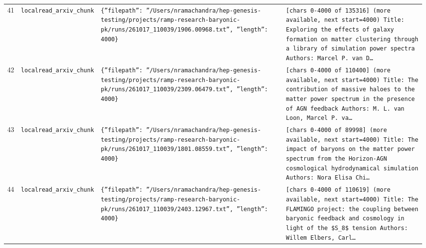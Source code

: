 \documentclass[11pt,a4paper]{article}
\begin{document}
\begin{longtable}{@{}p{}p{}p{}p{}@{}}
41 & \texttt{local}\newline\texttt{read\_\allowbreak{}arxiv\_\allowbreak{}chunk} & \texttt{\{''filepath'':\allowbreak{} ''/\allowbreak{}Users/\allowbreak{}nramachandra/\allowbreak{}hep-genesis-testing/\allowbreak{}projects/\allowbreak{}ramp-research-baryonic-pk/\allowbreak{}runs/\allowbreak{}261017\_\allowbreak{}110039/\allowbreak{}1906.00968.txt'',\allowbreak{} ''length'':\allowbreak{} 4000\}\allowbreak{}} & \texttt{[chars 0-4000 of 135316]\allowbreak{} (more available,\allowbreak{} next start=\allowbreak{}4000)\allowbreak{}  Title:\allowbreak{} Exploring the effects of galaxy formation on matter clustering through a library of simulation power spectra Authors:\allowbreak{} Marcel P. van D\ldots{}\allowbreak{}} \\
42 & \texttt{local}\newline\texttt{read\_\allowbreak{}arxiv\_\allowbreak{}chunk} & \texttt{\{''filepath'':\allowbreak{} ''/\allowbreak{}Users/\allowbreak{}nramachandra/\allowbreak{}hep-genesis-testing/\allowbreak{}projects/\allowbreak{}ramp-research-baryonic-pk/\allowbreak{}runs/\allowbreak{}261017\_\allowbreak{}110039/\allowbreak{}2309.06479.txt'',\allowbreak{} ''length'':\allowbreak{} 4000\}\allowbreak{}} & \texttt{[chars 0-4000 of 110400]\allowbreak{} (more available,\allowbreak{} next start=\allowbreak{}4000)\allowbreak{}  Title:\allowbreak{} The contribution of massive haloes to the matter power spectrum in the presence of AGN feedback Authors:\allowbreak{} M. L. van Loon,\allowbreak{} Marcel P. va\ldots{}\allowbreak{}} \\
43 & \texttt{local}\newline\texttt{read\_\allowbreak{}arxiv\_\allowbreak{}chunk} & \texttt{\{''filepath'':\allowbreak{} ''/\allowbreak{}Users/\allowbreak{}nramachandra/\allowbreak{}hep-genesis-testing/\allowbreak{}projects/\allowbreak{}ramp-research-baryonic-pk/\allowbreak{}runs/\allowbreak{}261017\_\allowbreak{}110039/\allowbreak{}1801.08559.txt'',\allowbreak{} ''length'':\allowbreak{} 4000\}\allowbreak{}} & \texttt{[chars 0-4000 of 89998]\allowbreak{} (more available,\allowbreak{} next start=\allowbreak{}4000)\allowbreak{}  Title:\allowbreak{} The impact of baryons on the matter power spectrum from the Horizon-AGN cosmological hydrodynamical simulation Authors:\allowbreak{} Nora Elisa Chi\ldots{}\allowbreak{}} \\
44 & \texttt{local}\newline\texttt{read\_\allowbreak{}arxiv\_\allowbreak{}chunk} & \texttt{\{''filepath'':\allowbreak{} ''/\allowbreak{}Users/\allowbreak{}nramachandra/\allowbreak{}hep-genesis-testing/\allowbreak{}projects/\allowbreak{}ramp-research-baryonic-pk/\allowbreak{}runs/\allowbreak{}261017\_\allowbreak{}110039/\allowbreak{}2403.12967.txt'',\allowbreak{} ''length'':\allowbreak{} 4000\}\allowbreak{}} & \texttt{[chars 0-4000 of 110619]\allowbreak{} (more available,\allowbreak{} next start=\allowbreak{}4000)\allowbreak{}  Title:\allowbreak{} The FLAMINGO project:\allowbreak{} the coupling between baryonic feedback and cosmology in light of the \$S\_\allowbreak{}8\$ tension Authors:\allowbreak{} Willem Elbers,\allowbreak{} Carl\ldots{}\allowbreak{}} \\

\end{longtable}
\end{document}
